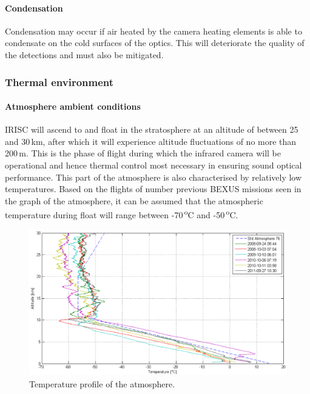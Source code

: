 \paragraph{Condensation}
Condensation may occur if air heated by the camera heating elements is able to condensate on the cold surfaces of the optics. This will deteriorate the quality of the detections and must also be mitigated.  \

\subsubsection{Thermal environment}
\paragraph{Atmosphere ambient conditions}
IRISC will ascend to and float in the stratosphere at an altitude of between 25 and 30\,km, after which it will experience altitude fluctuations of no more than 200\,m. This is the phase of flight during which the infrared camera will be operational and hence thermal control most necessary in ensuring sound optical performance. This part of the atmosphere is also characterised by relatively low temperatures. Based on the flights of number previous BEXUS missions seen in the graph of the atmosphere, it can be assumed that the atmospheric temperature during float will range between -70\,\textsuperscript{o}C and -50\,\textsuperscript{o}C. \\

	\begin{figure}[h!]
    \centering
    \includegraphics[scale=0.6]{4-experiment-design/img/mechanical/atmosphere.PNG}
	\caption{Temperature profile of the atmosphere.}
	\label{fig:atmosphere}
	\end{figure}

